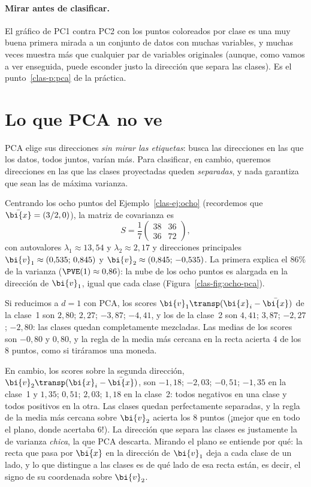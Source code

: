 \paragraph{Mirar antes de clasificar.} El gráfico de PC1 contra PC2 con los
puntos coloreados por clase es una muy buena primera mirada a un conjunto de
datos con muchas variables, y muchas veces muestra más que cualquier par de
variables originales (aunque, como vamos a ver enseguida, puede esconder
justo la dirección que separa las clases). Es el punto~\ref{clas-p:pca} de la
práctica.

\section{Lo que PCA no ve}\label{clas-sec:nove}

PCA elige sus direcciones \emph{sin mirar las etiquetas}: busca las
direcciones en las que los datos, todos juntos, varían más. Para clasificar,
en cambio, queremos direcciones en las que las clases proyectadas queden
\emph{separadas}, y nada garantiza que sean las de máxima varianza.

\begin{example}\label{clas-ej:ocho-pca}
Centrando los ocho puntos del Ejemplo~\ref{clas-ej:ocho} (recordemos que
$\bar{\bi{x}}=(3/2,0)$), la matriz de covarianza es
\[
S=\frac17\begin{pmatrix}38&36\\36&72\end{pmatrix},
\]
con autovalores $\lambda_1\approx13{,}54$ y $\lambda_2\approx2{,}17$ y
direcciones principales $\bi{v}_1\approx(0{,}535;\,0{,}845)$ y
$\bi{v}_2\approx(0{,}845;\,-0{,}535)$. La primera explica el $86\%$ de la
varianza ($\PVE(1)\approx0{,}86$): la nube de los ocho puntos es alargada en
la dirección de $\bi{v}_1$, igual que cada clase (Figura~\ref{clas-fig:ocho-pca}).

Si reducimos a $d=1$ con PCA, los scores $\bi{v}_1\transp(\bi{x}_i-\bar{\bi{x}})$ de la clase~1
son $2{,}80$; $2{,}27$; $-3{,}87$; $-4{,}41$, y los de la clase~2 son
$4{,}41$; $3{,}87$; $-2{,}27$; $-2{,}80$: las clases quedan completamente
mezcladas. Las medias de los scores son $-0{,}80$ y $0{,}80$, y la regla de la
media más cercana en la recta acierta $4$ de los $8$ puntos, como si
tiráramos una moneda.

En cambio, los scores sobre la segunda dirección, $\bi{v}_2\transp(\bi{x}_i-\bar{\bi{x}})$,
son $-1{,}18$; $-2{,}03$; $-0{,}51$; $-1{,}35$ en la clase~1 y $1{,}35$;
$0{,}51$; $2{,}03$; $1{,}18$ en la clase~2: todos negativos en una clase y
todos positivos en la otra. Las clases quedan perfectamente separadas, y la
regla de la media más cercana sobre $\bi{v}_2$ acierta los $8$ puntos (¡mejor que
en todo el plano, donde acertaba $6$!). La dirección que separa las clases es
justamente la de varianza \emph{chica}, la que PCA descarta. Mirando el plano
se entiende por qué: la recta que pasa por $\bar{\bi{x}}$ en la dirección de $\bi{v}_1$
deja a cada clase de un lado, y lo que distingue a las clases es de qué lado de
esa recta están, es decir, el signo de su coordenada sobre $\bi{v}_2$.
\end{example}

